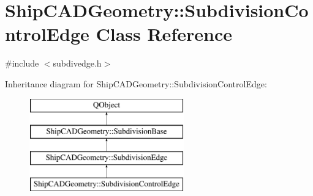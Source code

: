 \hypertarget{classShipCADGeometry_1_1SubdivisionControlEdge}{\section{Ship\-C\-A\-D\-Geometry\-:\-:Subdivision\-Control\-Edge Class Reference}
\label{classShipCADGeometry_1_1SubdivisionControlEdge}
}


{\ttfamily \#include $<$subdivedge.\-h$>$}

Inheritance diagram for Ship\-C\-A\-D\-Geometry\-:\-:Subdivision\-Control\-Edge\-:\begin{figure}[H]
\begin{center}
\leavevmode
\includegraphics[height=4.000000cm]{classShipCADGeometry_1_1SubdivisionControlEdge}
\end{center}
\end{figure}
